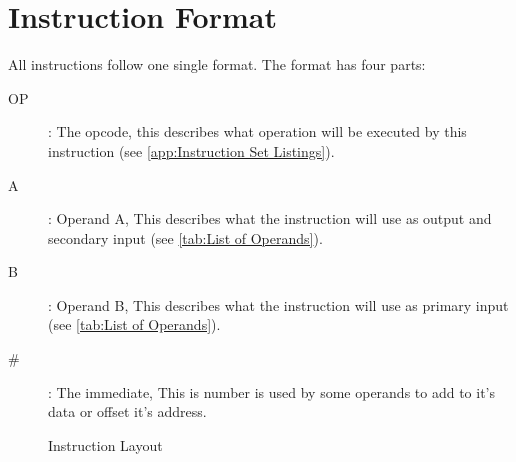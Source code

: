 \documentclass[oneside, a4paper]{memoir}
\begin{document}
\section{Instruction Format}
All instructions follow one single format. The format has four parts:
\begin{description}
\item[OP]: The opcode, this describes what operation will be executed by this instruction (see \autoref{app:Instruction Set Listings}).
\item[A]: Operand A, This describes what the instruction will use as output and secondary input (see \autoref{tab:List of Operands}).
\item[B]: Operand B, This describes what the instruction will use as primary input (see \autoref{tab:List of Operands}).
\item[\#]: The immediate, This is number is used by some operands to add to it's data or offset it's address.
\end{description}
\begin{figure}[h!]
\begin{center}
\caption{Instruction Layout}
\end{center}
\end{figure}
\end{document}
